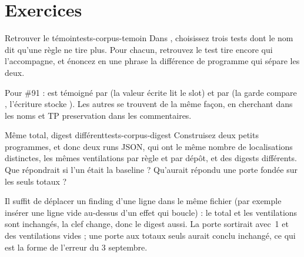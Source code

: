 \section{Exercices}
\label{sec:tests-corpus-exercices}

\begin{exercice}{Retrouver le témoin}{tests-corpus-temoin}
Dans , choisissez trois tests dont le nom dit qu'une règle ne tire plus. Pour chacun, retrouvez le test \og tire encore\fg{} qui l'accompagne, et énoncez en une phrase la différence de programme qui sépare les deux.
\end{exercice}
\begin{solution}
Pour \#91 :  est témoigné par  (la valeur écrite lit le slot) et par  (la garde compare , l'écriture stocke ). Les autres se trouvent de la même façon, en cherchant  dans les noms et \og TP preservation\fg{} dans les commentaires.
\end{solution}

\begin{exercice}{Même total, digest différent}{tests-corpus-digest}
Construisez deux petits programmes, et donc deux runs JSON, qui ont le même nombre de localisations distinctes, les mêmes ventilations par règle et par dépôt, et des digests différents. Que répondrait  si l'un était la baseline ? Qu'aurait répondu une porte fondée sur les seuls totaux ?
\end{exercice}
\begin{solution}
Il suffit de déplacer un finding d'une ligne dans le même fichier (par exemple insérer une ligne vide au-dessus d'un effet qui boucle) : le total et les ventilations sont inchangés, la clef  change, donc le digest aussi. La porte sortirait avec~1 et des ventilations vides ; une porte aux totaux seuls aurait conclu \og inchangé\fg{}, ce qui est la forme de l'erreur du 3 septembre.
\end{solution}

